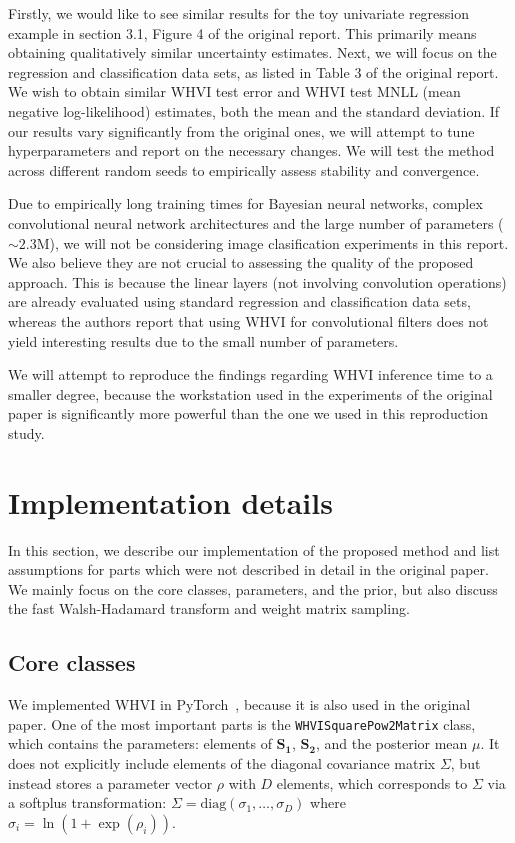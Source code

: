\documentclass[11pt, twocolumn]{article}
\begin{document}
    Firstly, we would like to see similar results for the toy univariate regression example in section 3.1, Figure 4 of the original report.
    This primarily means obtaining qualitatively similar uncertainty estimates.
    Next, we will focus on the regression and classification data sets, as listed in Table 3 of the original report.
    We wish to obtain similar WHVI test error and WHVI test MNLL (mean negative log-likelihood) estimates, both the mean and the standard deviation.
    If our results vary significantly from the original ones, we will attempt to tune hyperparameters and report on the necessary changes.
    We will test the method across different random seeds to empirically assess stability and convergence.

    Due to empirically long training times for Bayesian neural networks, complex convolutional neural network architectures and the large number of parameters ($\sim 2.3$M), we will not be considering image clasification experiments in this report.
    We also believe they are not crucial to assessing the quality of the proposed approach.
    This is because the linear layers (not involving convolution operations) are already evaluated using standard regression and classification data sets, whereas the authors report that using WHVI for convolutional filters does not yield interesting results due to the small number of parameters.

    We will attempt to reproduce the findings regarding WHVI inference time to a smaller degree, because the workstation used in the experiments of the original paper is significantly more powerful than the one we used in this reproduction study.

    \section{Implementation details}\label{sec:implementation-details}
    In this section, we describe our implementation of the proposed method and list assumptions for parts which were not described in detail in the original paper.
    We mainly focus on the core classes, parameters, and the prior, but also discuss the fast Walsh-Hadamard transform and weight matrix sampling.
    \subsection{Core classes}\label{subsec:core-classes}
    We implemented WHVI in PyTorch~\cite{pytorch}, because it is also used in the original paper.
    One of the most important parts is the \texttt{WHVISquarePow2Matrix} class, which contains the parameters: elements of $\mathbf{S_1}$, $\mathbf{S_2}$, and the posterior mean $\mu$.
    It does not explicitly include elements of the diagonal covariance matrix $\Sigma$, but instead stores a parameter vector $\rho$ with $D$ elements, which corresponds to $\Sigma$ via a softplus transformation: $\Sigma = \mathrm{diag}(\sigma_1, \dots, \sigma_D)$ where $\sigma_i = \ln(1 + \exp(\rho_i))$.
\end{document}
